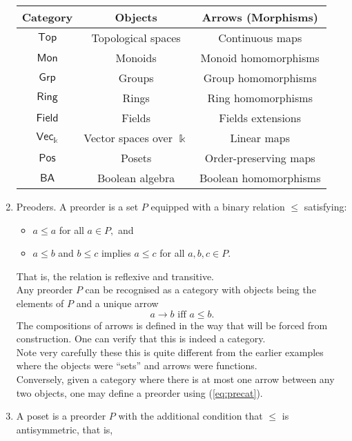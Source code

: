 \begin{enumerate}
	\begin{center}
		\begin{tabular}{|c|c|c|}
		\hline
		Category & Objects & Arrows (Morphisms)\\
		\hline
		$\mathsf{Top}$ & Topological spaces & Continuous maps\\
		$\mathsf{Mon}$ & Monoids & Monoid homomorphisms\\
		$\mathsf{Grp}$ & Groups & Group homomorphisms\\
		$\mathsf{Ring}$ & Rings & Ring homomorphisms\\
		$\mathsf{Field}$ & Fields & Fields extensions\\
		$\mathsf{Vec}_\Bbbk$ & Vector spaces over $\Bbbk$ & Linear maps\\
		$\mathsf{Pos}$ & Posets & Order-preserving maps\\
		$\mathsf{BA}$ & Boolean algebra & Boolean homomorphisms\\
		\hline
		\end{tabular}
	\end{center}
	\item Preoders. A preorder is a set $P$ equipped with a binary relation $\le$ satisfying:
	\begin{itemize}
		\item $a \le a$ for all $a \in P,$ and
		\item $a \le b$ and $b \le c$ implies $a \le c$ for all $a, b, c \in P.$
	\end{itemize}
	That is, the relation is reflexive and transitive.\\
	Any preorder $P$ can be recognised as a category with objects being the elements of $P$ and a unique arrow 
	\begin{equation} \label{eq:precat}
		a \to b \text{ iff } a \le b.
	\end{equation}
	The compositions of arrows is defined in the way that will be forced from construction. One can verify that this is indeed a category.\\
	Note very carefully these this is quite different from the earlier examples where the objects were ``sets'' and  arrows were functions.\\
	Conversely, given a category where there is at most one arrow between any two objects, one may define a preorder using (\ref{eq:precat}).
	\item A poset is a preorder $P$ with the additional condition that $\le$ is antisymmetric, that is,
	\begin{equation*} 

\end{equation*}
\end{enumerate}
